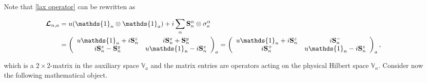 \documentclass{homework}
\begin{document}
 Note that \cref{lax operator} can be rewritten as 

\begin{equation}
    \begin{split}
    \bm{\mathcal{L}}_{n, a} &= u(\mathds{1}_n \otimes \mathds{1}_a) + i \sum_{\alpha} \spin_n^\alpha \otimes \sigma_{a}^\alpha \\
    &= \left(\begin{array}{cc}
       u \mathds{1}_n + i \spin^{z}_{n} & i \spin^{x}_{n} + \spin^{y}_{n} \\
       i \spin^{x}_{n} - \spin^{y}_{n}  & u \mathds{1}_n - i \spin^{z}_{n}
    \end{array}\right)_a = \left(\begin{array}{cc}
       u \mathds{1}_n + i \spin^{z}_{n} & i \spin^{-}_{n} \\
       i \spin^{+}_{n} & u \mathds{1}_n - i \spin^{z}_{n}
    \end{array}\right)_a,
    \end{split}
\end{equation}
    
which is a $2 \times 2$-matrix in the auxiliary space $\mathds{V}_a$ and the matrix entries are operators acting on the physical Hilbert space $\mathds{V}_n$. Consider now the following mathematical object. 
\end{document}
